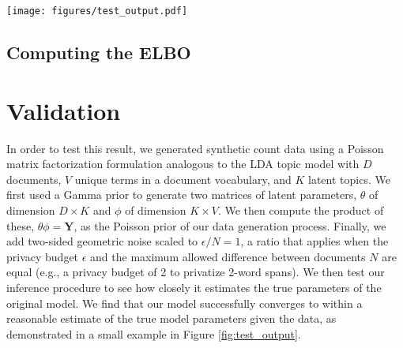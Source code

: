 \documentclass{article}
\newcommand{\Yten}{\pmb{Y}}
\newcommand{\naive}{na\"{i}ve}
\begin{document}
  \begin{figure*}[t]
    \centering
    \texttt{[image: figures/test\_output.pdf]}
    \caption{Demonstration of the results of the VI inference process for a
     50-word, 50-document synthetic dataset with 5 latent topics and Gamma prior
     parameters of shape 0.5 and rate 1. The true data parameters (a) are
     recovered better by our inference procedure (e) than by \naive~variational
     inference (d), even though the noisy data (c) is much denser than the true
     data (b). Though inconsistent, in some random trials where we incorrectly
     informed the model that $\epsilon / N = 0.9$, our estimates of the prior,
     while lower-magnitude, would be closer to the true model.}
    \label{fig:test_output}
\end{figure*}
  
  \subsection{Computing the ELBO} %
  
  
  \section{Validation}
  \label{sec:validation}

  In order to test this result, we generated synthetic count data using a
  Poisson matrix factorization formulation analogous to the LDA topic model
  \citep{blei2003latent} with $D$ documents, $V$ unique terms in a document
  vocabulary, and $K$ latent topics. We first used a Gamma prior to generate two
  matrices of latent parameters, $\theta$ of dimension $D \times K$ and $\phi$
  of dimension $K \times V$. We then compute the product of these, $\theta \phi
  = \Yten$, as the Poisson prior of our data generation process. Finally, we add
  two-sided geometric noise scaled to $\epsilon / N = 1$, a ratio that applies
  when the privacy budget $\epsilon$ and the maximum allowed difference between
  documents $N$ are equal (e.g., a privacy budget of 2 to privatize 2-word
  spans). We then test our inference procedure to see how closely it estimates
  the true parameters of the original model. We find that our model successfully
  converges to within a reasonable estimate of the true model parameters given
  the data, as demonstrated in a small example in Figure \ref{fig:test_output}.
  
\end{document}
